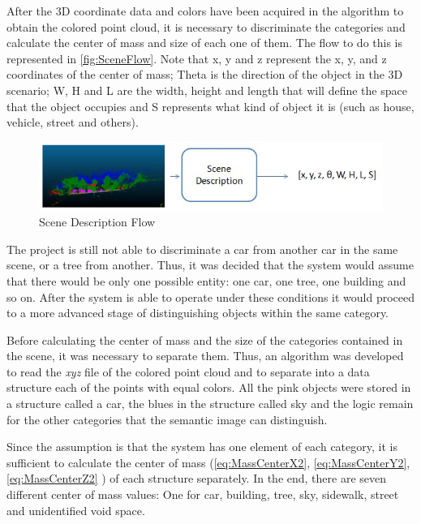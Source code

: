     After the 3D coordinate data and colors have been acquired in the algorithm to obtain the colored point cloud, it is necessary to discriminate the categories and calculate the center of mass and size of each one of them. The flow to do this is represented in \autoref{fig:SceneFlow}. Note that x, y and z represent the x, y, and z coordinates of the center of mass; Theta is the direction of the object in the 3D scenario; W, H and L are the width, height and length that will define the space that the object occupies and S represents what kind of object it is (such as house, vehicle, street and others).
    
    \begin{figure}[H]
        \caption{
        \label{fig:SceneFlow}
            Scene Description Flow}
        \begin{center}
        \includegraphics[width=1\textwidth]{images/sceneFlow.png}
        \end{center}
    \end{figure}    
    
    The project is still not able to discriminate a car from another car in the same scene, or a tree from another. Thus, it was decided that the system would assume that there would be only one possible entity: one car, one tree, one building and so on. After the system is able to operate under these conditions it would proceed to a more advanced stage of distinguishing objects within the same category.

    Before calculating the center of mass and the size of the categories contained in the scene, it was necessary to separate them. Thus, an algorithm was developed to read the \textit{xyz} file of the colored point cloud and to separate into a data structure each of the points with equal colors. All the pink objects were stored in a structure called a car, the blues in the structure called sky and the logic remain for the other categories that the semantic image can distinguish.

    Since the assumption is that the system has one element of each category, it is sufficient to calculate the center of mass (\autoref{eq:MassCenterX2}, \autoref{eq:MassCenterY2}, \autoref{eq:MassCenterZ2} ) of each structure separately. In the end, there are seven different center of mass values: One for car, building, tree, sky, sidewalk, street and unidentified void space.

